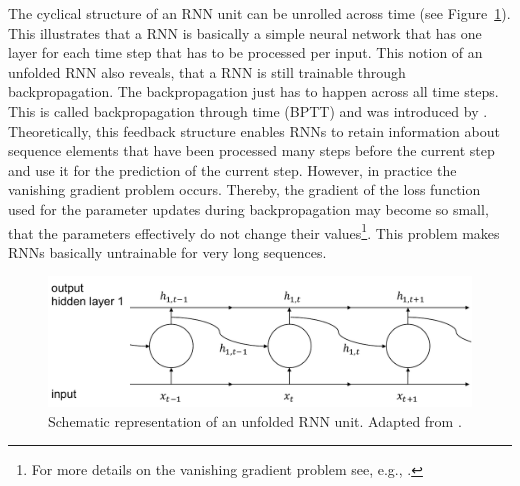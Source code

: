 The cyclical structure of an RNN unit can be unrolled across time (see Figure~\ref{Fig:RNNunfolded}). This illustrates that a RNN is basically a simple neural network that has one layer for each time step that has to be processed per input. This notion of an unfolded RNN also reveals, that a RNN is still trainable through backpropagation. The backpropagation just has to happen across all time steps. This is called backpropagation through time (BPTT) and was introduced by \citet{Werbos:1990}. Theoretically, this feedback structure enables RNNs to retain information about sequence elements that have been processed many steps before the current step and use it for the prediction of the current step. However, in practice the vanishing gradient problem occurs. Thereby, the gradient of the loss function used for the parameter updates during backpropagation may become so small, that the parameters effectively do not change their values\footnote{For more details on the vanishing gradient problem see, e.g., \citet{Bengio:1994}.}. This problem makes RNNs basically untrainable for very long sequences.
%
\begin{figure}[htbp]
    \centering
    \includegraphics[scale=0.6]{thesis/figures/RNNunfolded.pdf}
    \caption[Schematic representation of an unfolded RNN unit]{Schematic representation of an unfolded RNN unit. Adapted from \citet{Chollet:2018}.}
    \label{Fig:RNNunfolded}
\end{figure}




